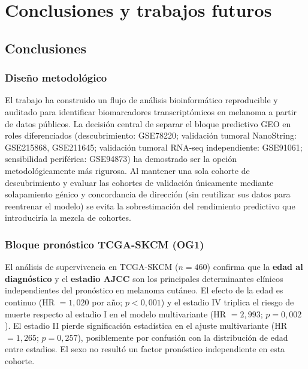 \chapter{Conclusiones y trabajos futuros}

\section{Conclusiones}

\subsection{Diseño metodológico}

El trabajo ha construido un flujo de análisis bioinformático reproducible y auditado para identificar biomarcadores transcriptómicos en melanoma a partir de datos públicos. La decisión central de separar el bloque predictivo GEO en roles diferenciados (descubrimiento: GSE78220; validación tumoral NanoString: GSE215868, GSE211645; validación tumoral RNA-seq independiente: GSE91061; sensibilidad periférica: GSE94873) ha demostrado ser la opción metodológicamente más rigurosa. Al mantener una sola cohorte de descubrimiento y evaluar las cohortes de validación únicamente mediante solapamiento génico y concordancia de dirección (sin reutilizar sus datos para reentrenar el modelo) se evita la sobrestimación del rendimiento predictivo que introduciría la mezcla de cohortes.

\subsection{Bloque pronóstico TCGA-SKCM (OG1)}

El análisis de supervivencia en TCGA-SKCM ($n = 460$) confirma que la \textbf{edad al diagnóstico} y el \textbf{estadio AJCC} son los principales determinantes clínicos independientes del pronóstico en melanoma cutáneo. El efecto de la edad es continuo (HR $= 1{,}020$ por año; $p < 0{,}001$) y el estadio IV triplica el riesgo de muerte respecto al estadio I en el modelo multivariante (HR $= 2{,}993$; $p = 0{,}002$). El estadio II pierde significación estadística en el ajuste multivariante (HR $= 1{,}265$; $p = 0{,}257$), posiblemente por confusión con la distribución de edad entre estadios. El sexo no resultó un factor pronóstico independiente en esta cohorte.

